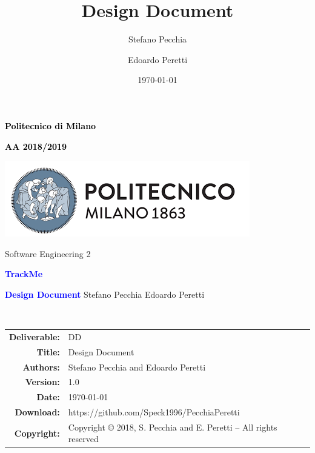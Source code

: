 \documentclass[a4paper,11pt]{report}
\title{Design Document}
\author{Stefano Pecchia \and Edoardo Peretti}
\date{\today}
\begin{document}
\begin{titlepage}
\centering

\textcolor{black}{\textbf{Politecnico di Milano}} \par
\textcolor{black}{\textbf{AA 2018/2019}} \par  \vspace{2em}
\includegraphics[scale=0.7]{resources/PolimiLogo}\par \vspace{1em}

Software Engineering 2 \par \vspace{1.5cm}
\textcolor{Blue}{\Large\textbf{TrackMe}} \par \vspace{3cm}

{\textcolor{Blue}{\textbf{\Huge{Design Document}}}} \vfill
Stefano Pecchia \hspace{5em} Edoardo Peretti \vspace{4cm}
\end{titlepage}


\
\begin{table}[h!]
\centering
\begin{tabular}{rl}
\hline
\textbf{Deliverable:} & DD\\
\textbf{Title:} & Design Document \\
\textbf{Authors:} & Stefano Pecchia and Edoardo Peretti\\
\textbf{Version:} & 1.0 \\ 
\textbf{Date:} & \today \\
\textbf{Download:} & https://github.com/Speck1996/PecchiaPeretti \\
\textbf{Copyright:} & Copyright © 2018, S. Pecchia and E. Peretti – All rights reserved \\
\hline
\end{tabular}
\end{table}



\tableofcontents







\end{document}
